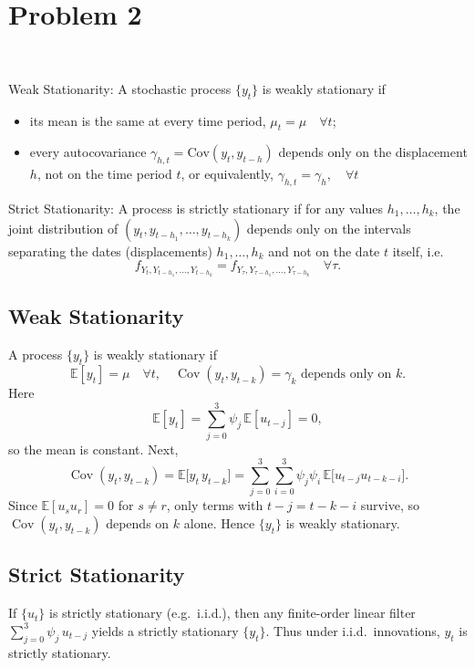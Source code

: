\documentclass[a4paper,12pt]{article} %
\theoremstyle{nonitalic}
\newenvironment{solution}[1]
  {\renewcommand\theinnercustomsol{#1}%
   \innercustomsol}
  {\endinnercustomsol}
\newcounter{solutionctr}[section]
\renewcommand{\thesolutionctr}{(\alph{solutionctr})}
\newenvironment{autosolution}
  {\refstepcounter{solutionctr}%
   \begin{solution}{\thesolutionctr}}
  {\end{solution}}
\begin{document}
\section{Problem 2}

\begin{autosolution}
    \

    Weak Stationarity: A stochastic process $\{y_{t}\}$ is weakly stationary if 
    \begin{itemize}
        \item its mean is the same at every time period, $\mu_{t}=\mu\quad\forall t$;
        \item every autocovariance $\gamma_{h,t}=\mathrm{Cov}(y_{t},y_{t-h})$ depends only on the displacement $h$, not on the time period $t$, or equivalently, $\gamma_{h,t}=\gamma_{h},\quad\forall t$
    \end{itemize} 
    Strict Stationarity: A process is strictly stationary if for any values $h_{1},\ldots,h_{k}$, the joint distribution of $(y_{t},y_{t-h_{1}},\ldots,y_{t-h_{k}})$ depends only on the intervals separating the dates (displacements) $h_{1},\ldots,h_{k}$ and not on the date $t$ itself, i.e.
$$f_{Y_{t},Y_{t-h_{1}},\ldots,Y_{t-h_{k}}} = f_{Y_{\tau},Y_{\tau-h_{1}},\ldots,Y_{\tau-h_{k}}}\quad\forall\tau.$$
    \subsection*{Weak Stationarity}

    A process $\{y_t\}$ is weakly stationary if
    \[
    \mathbb{E}[y_t]=\mu\quad \forall t,
    \quad 
    \operatorname{Cov}(y_t,y_{t-k})=\gamma_k \text{ depends only on }k.
    \]
    Here
    \[
    \mathbb{E}[y_t]
    =\sum_{j=0}^3\psi_j\,\mathbb{E}[u_{t-j}]
    =0,
    \]
    so the mean is constant.  Next,
    \[
    \operatorname{Cov}(y_t,y_{t-k})
    =\mathbb{E}\bigl[y_t\,y_{t-k}\bigr]
    =\sum_{j=0}^3\sum_{i=0}^3\psi_j\psi_i\,
    \mathbb{E}\bigl[u_{t-j}u_{t-k-i}\bigr].
    \]
    Since $\mathbb{E}[u_su_r]=0$ for $s\neq r$, only terms with
    $t-j = t-k-i$ survive, so $\operatorname{Cov}(y_t,y_{t-k})$ depends on $k$ alone.  
    Hence $\{y_t\}$ is weakly stationary.

    \subsection*{Strict Stationarity}

    If $\{u_t\}$ is strictly stationary (e.g.\ i.i.d.), then any finite-order linear filter
    $\sum_{j=0}^3\psi_j\,u_{t-j}$
    yields a strictly stationary $\{y_t\}$.  Thus under i.i.d.\ innovations, $y_t$ is strictly stationary.
\end{autosolution}
\end{document}
